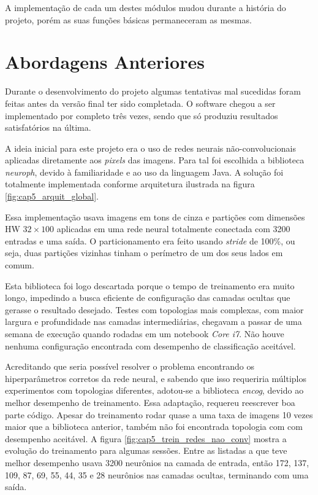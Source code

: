 A implementação de cada um destes módulos mudou durante a história do projeto,
porém as suas funções básicas permaneceram as mesmas.

\section{Abordagens Anteriores}
Durante o desenvolvimento do projeto algumas tentativas mal sucedidas foram
feitas antes da versão final ter sido completada. O software chegou a ser
implementado por completo três vezes, sendo que só produziu resultados
satisfatórios na última.

A ideia inicial para este projeto era o uso de redes neurais não-convolucionais
aplicadas diretamente aos \emph{pixels} das imagens. Para tal foi escolhida a
biblioteca \emph{neuroph}, devido à familiaridade e ao uso da linguagem Java. A
solução foi totalmente implementada conforme arquitetura ilustrada na figura
\ref{fig:cap5_arquit_global}.

Essa implementação usava imagens em tons de cinza e partições com dimensões HW
$32 \times 100$ aplicadas em uma rede neural totalmente conectada com 3200
entradas e uma saída. O particionamento era feito usando \emph{stride} de
100\%, ou seja, duas partições vizinhas tinham o perímetro de um dos seus
lados em comum.

Esta biblioteca foi logo descartada porque o tempo de treinamento era muito
longo, impedindo a busca eficiente de configuração das camadas ocultas que
gerasse o resultado desejado. Testes com topologias mais complexas, com maior
largura e profundidade nas camadas intermediárias, chegavam a passar de uma
semana de execução quando rodadas em um notebook \emph{Core i7}. Não houve
nenhuma configuração encontrada com desempenho de classificação aceitável.

Acreditando que seria possível resolver o problema encontrando os
hiperparâmetros corretos da rede neural, e sabendo que isso requeriria
múltiplos experimentos com topologias diferentes, adotou-se a biblioteca
\emph{encog},
devido ao melhor desempenho de treinamento. Essa adaptação, requereu reescrever
boa parte código. Apesar do treinamento rodar quase a uma taxa de imagens 10
vezes maior que a biblioteca anterior, também não foi encontrada topologia
com com desempenho aceitável. A figura
\ref{fig:cap5_trein_redes_nao_conv} mostra a
evolução do treinamento para algumas sessões. Entre as listadas a que teve
melhor desempenho usava 3200 neurônios na camada de entrada, então 172, 137,
109, 87, 69, 55, 44, 35 e 28 neurônios nas camadas ocultas, terminando
com uma saída.

